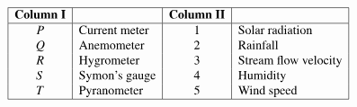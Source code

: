 \[
\begin{array}{|c|l|c|l|}
\hline
\textbf{Column I} &         & \textbf{Column II}      &        \\
\hline
P & \text{Current meter} & 1 & \text{Solar radiation} \\
Q & \text{Anemometer}    & 2 & \text{Rainfall}        \\
R & \text{Hygrometer}    & 3 & \text{Stream flow velocity} \\
S & \text{Symon's gauge} & 4 & \text{Humidity}        \\
T & \text{Pyranometer}   & 5 & \text{Wind speed}      \\
\hline
\end{array}
\]